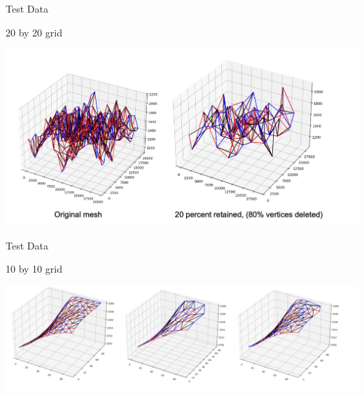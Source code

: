 \begin{frame}{Test Data}
\begin{center}
    
        20 by 20 grid
        
    \end{center}
    \begin{center}
        \includegraphics[scale=.58]{images/20by20.png}
        
    \end{center}

\end{frame}

\begin{frame}{Test Data}
    \begin{center}
        
            10 by 10 grid
            
        \end{center}
        \begin{center}
            \includegraphics[scale=.74]{images/10by10.png}
            
        \end{center}
    
    \end{frame}